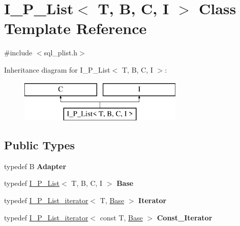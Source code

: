 \hypertarget{classI__P__List}{}\section{I\+\_\+\+P\+\_\+\+List$<$ T, B, C, I $>$ Class Template Reference}
\label{classI__P__List}


{\ttfamily \#include $<$sql\+\_\+plist.\+h$>$}

Inheritance diagram for I\+\_\+\+P\+\_\+\+List$<$ T, B, C, I $>$\+:\begin{figure}[H]
\begin{center}
\leavevmode
\includegraphics[height=2.000000cm]{classI__P__List}
\end{center}
\end{figure}
\subsection*{Public Types}
\begin{DoxyCompactItemize}
\item 
\mbox{\label{classI__P__List_a3d60550d83623e3e7ec2d78627b97af7}} 
typedef B {\bfseries Adapter}
\item 
\mbox{\label{classI__P__List_a2f80d28769e1848c4bf86c8270aae789}} 
typedef \mbox{\hyperlink{classI__P__List}{I\+\_\+\+P\+\_\+\+List}}$<$ T, B, C, I $>$ {\bfseries Base}
\item 
\mbox{\label{classI__P__List_ae93e3648df7beb86049f429074a451cf}} 
typedef \mbox{\hyperlink{classI__P__List__iterator}{I\+\_\+\+P\+\_\+\+List\+\_\+iterator}}$<$ T, \mbox{\hyperlink{classI__P__List}{Base}} $>$ {\bfseries Iterator}
\item 
\mbox{\label{classI__P__List_a4634d2da9521d26c5d4684109b570a99}} 
typedef \mbox{\hyperlink{classI__P__List__iterator}{I\+\_\+\+P\+\_\+\+List\+\_\+iterator}}$<$ const T, \mbox{\hyperlink{classI__P__List}{Base}} $>$ {\bfseries Const\+\_\+\+Iterator}
\end{DoxyCompactItemize}
